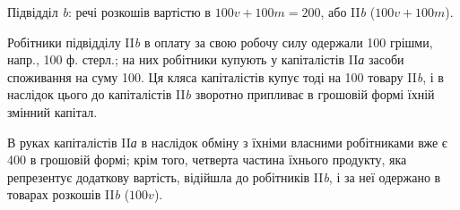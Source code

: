 Підвідділ \emph{b}: речі розкошів вартістю в $100 v + 100 m = 200$, або
II\emph{b} ($100 v + 100 m$).

Робітники підвідділу II\emph{b} в оплату за свою робочу силу одержали
100 грішми, напр., 100 ф. стерл.; на них робітники купують у капіталістів
II\emph{а} засоби споживання на суму 100. Ця кляса капіталістів купує
тоді на 100 товару II\emph{b}, і в наслідок цього до капіталістів II\emph{b}
зворотно припливає в грошовій формі їхній змінний капітал.

В руках капіталістів II\emph{а} в наслідок обміну з їхніми власними робітниками
вже є 400 в грошовій формі; крім того, четверта частина їхнього
продукту, яка репрезентує додаткову вартість, відійшла до робітників
II\emph{b}, і за неї одержано в товарах розкошів II\emph{b} ($100 v$).
